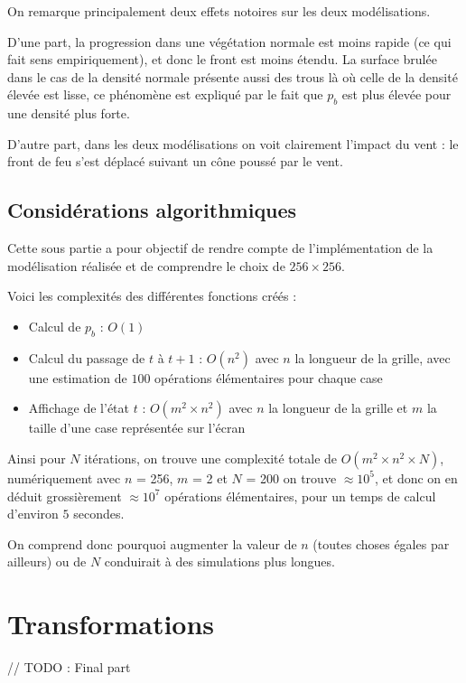\documentclass[12pt]{article}
\begin{document}
On remarque principalement deux effets notoires sur les deux modélisations.

D'une part, la progression dans une végétation normale est moins rapide (ce qui fait sens empiriquement), et donc le front est moins étendu. La surface brulée dans le cas de la densité normale présente aussi des trous là où celle de la densité élevée est lisse, ce phénomène est expliqué par le fait que $p_b$ est plus élevée pour une densité plus forte.

D'autre part, dans les deux modélisations on voit clairement l'impact du vent : le front de feu s'est déplacé suivant un cône poussé par le vent.

\subsection{Considérations algorithmiques}

Cette sous partie a pour objectif de rendre compte de l'implémentation de la modélisation réalisée et de comprendre le choix de $256 \times 256$.

Voici les complexités des différentes fonctions créés :

\begin{itemize}
    \item Calcul de $p_b$ : $O(1)$
    \item Calcul du passage de $t$ à $t+1$ : $O(n^2)$ avec $n$ la longueur de la grille, avec une estimation de $100$ opérations élémentaires pour chaque case
    \item Affichage de l'état $t$ : $O(m^2 \times n^2)$ avec $n$ la longueur de la grille et $m$ la taille d'une case représentée sur l'écran
\end{itemize}

Ainsi pour $N$ itérations, on trouve une complexité totale de $O(m^2 \times n^2 \times N)$, numériquement avec $n$ = 256, $m$ = 2 et $N$ = 200 on trouve $\approx 10^5$, et donc on en déduit grossièrement $\approx 10^7$ opérations élémentaires, pour un temps de calcul d'environ $5$ secondes.

On comprend donc pourquoi augmenter la valeur de $n$ (toutes choses égales par ailleurs) ou de $N$ conduirait à des simulations plus longues.

\section{Transformations}

// TODO : Final part
\end{document}
